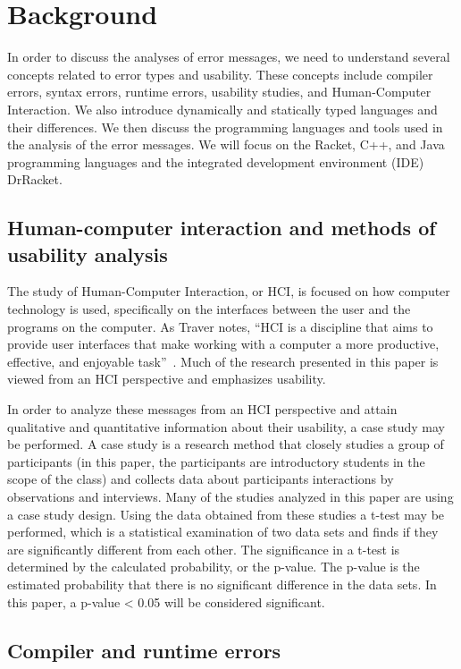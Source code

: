 \documentclass{sig-alternate}
\begin{document}
\section{Background}\label{sec:background}
In order to discuss the analyses of error messages, we need to understand several concepts related to error types and usability.
These concepts include compiler errors, syntax errors, runtime errors, usability studies, and Human-Computer Interaction.
We also introduce dynamically and statically typed languages and their differences.
We then discuss the programming languages and tools used in the analysis of the error messages.
We will focus on the Racket, C++, and Java programming languages and the integrated development environment (IDE) DrRacket.


\subsection{Human-computer interaction and methods of usability analysis}\label{subsec:hci}

The study of Human-Computer Interaction, or HCI, is focused on how computer technology is used, specifically on the interfaces between the user and the programs on the computer.
As Traver notes, ``HCI is a discipline that aims to provide user interfaces that make working with a computer a more productive, effective, and enjoyable task''~\cite{Traver:2010}.
Much of the research presented in this paper is viewed from an HCI perspective and emphasizes usability.

In order to analyze these messages from an HCI perspective and attain qualitative and quantitative information about their usability, a case study may be performed.
A case study is a research method that closely studies a group of participants (in this paper, the participants are introductory students in the scope of the class) and collects data about participants interactions by observations and interviews. 
Many of the studies analyzed in this paper are using a case study design.
Using the data obtained from these studies a t-test may be performed, which is a statistical examination of two data sets and finds if they are significantly different from each other.
The significance in a t-test is determined by the calculated probability, or the p-value.
The p-value is the estimated probability that there is no significant difference in the data sets.
In this paper, a p-value < 0.05 will be considered significant.

\subsection{Compiler and runtime errors}\label{subsec:error types}
\end{document}
